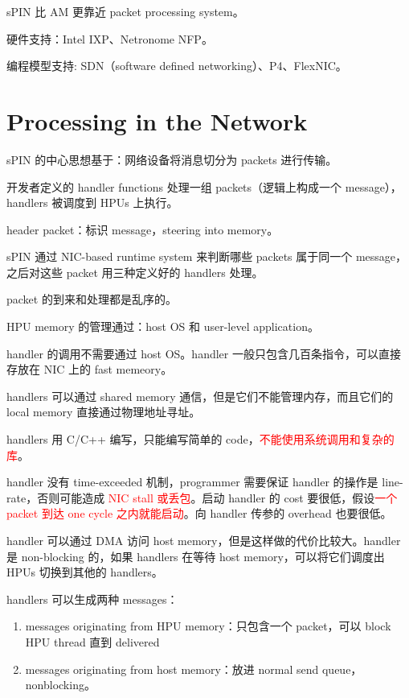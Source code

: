 \documentclass[cn,pad,11pt,green,geye]{../elegantnote}
\begin{document}
sPIN 比 AM 更靠近 packet processing system。

硬件支持：Intel IXP、Netronome NFP。

编程模型支持: SDN（software defined networking）、P4、FlexNIC。

\section{Processing in the Network}
sPIN 的中心思想基于：网络设备将消息切分为 packets 进行传输。

开发者定义的 handler functions 处理一组 packets（逻辑上构成一个 message），handlers 被调度到 HPUs 上执行。

header packet：标识 message，steering into memory。

sPIN 通过 NIC-based runtime system 来判断哪些 packets 属于同一个 message，之后对这些 packet 用三种定义好的 handlers 处理。

\begin{note}
   packet 的到来和处理都是乱序的。
\end{note}

HPU memory 的管理通过：host OS 和 user-level application。

handler 的调用不需要通过 host OS。handler 一般只包含几百条指令，可以直接存放在 NIC 上的 fast memeory。

handlers 可以通过 shared memory 通信，但是它们不能管理内存，而且它们的 local memory 直接通过物理地址寻址。

handlers 用 C/C++ 编写，只能编写简单的 code，\textcolor{red}{不能使用系统调用和复杂的库}。

handler 没有 time-exceeded 机制，programmer 需要保证 handler 的操作是 line-rate，否则可能造成 \textcolor{red}{NIC stall 或丢包}。启动 handler 的 cost 要很低，假设\textcolor{red}{一个 packet 到达 one cycle 之内就能启动}。向 handler 传参的 overhead 也要很低。

handler 可以通过 DMA 访问 host memory，但是这样做的代价比较大。handler 是 non-blocking 的，如果 handlers 在等待 host memory，可以将它们调度出 HPUs 切换到其他的 handlers。

handlers 可以生成两种 messages：
\begin{enumerate}
   \item messages originating from HPU memory：只包含一个 packet，可以 block HPU thread 直到 delivered
   \item messages originating from host memory：放进 normal send queue，nonblocking。
\end{enumerate} 
\end{document}
